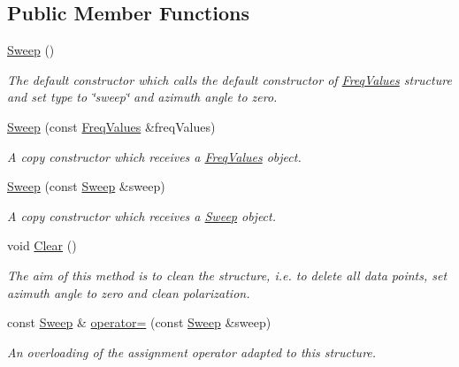 \subsection*{Public Member Functions}
\begin{DoxyCompactItemize}
\item 
\mbox{\label{structSweep_a154d8154b44ffd83c26375ca8d688591}} 
\hyperlink{structSweep_a154d8154b44ffd83c26375ca8d688591}{Sweep} ()
\begin{DoxyCompactList}\small\item\em The default constructor which calls the default constructor of {\itshape \hyperlink{structFreqValues}{Freq\+Values}} structure and set type to \char`\"{}sweep\char`\"{} and azimuth angle to zero. \end{DoxyCompactList}\item 
\hyperlink{structSweep_ae85ac9f2a48f93e3fc510118c7d67f7f}{Sweep} (const \hyperlink{structFreqValues}{Freq\+Values} \&freq\+Values)
\begin{DoxyCompactList}\small\item\em A copy constructor which receives a {\itshape \hyperlink{structFreqValues}{Freq\+Values}} object. \end{DoxyCompactList}\item 
\hyperlink{structSweep_a0a4e0f72fe9051d35cb29953005463b3}{Sweep} (const \hyperlink{structSweep}{Sweep} \&sweep)
\begin{DoxyCompactList}\small\item\em A copy constructor which receives a {\itshape \hyperlink{structSweep}{Sweep}} object. \end{DoxyCompactList}\item 
\mbox{\label{structSweep_aa852ab0cf53dc52ec354649cf6cec31e}} 
void \hyperlink{structSweep_aa852ab0cf53dc52ec354649cf6cec31e}{Clear} ()
\begin{DoxyCompactList}\small\item\em The aim of this method is to clean the structure, i.\+e. to delete all data points, set azimuth angle to zero and clean polarization. \end{DoxyCompactList}\item 
const \hyperlink{structSweep}{Sweep} \& \hyperlink{structSweep_a0cd5bc95e0e71b06887de9de4ea5ee6a}{operator=} (const \hyperlink{structSweep}{Sweep} \&sweep)
\begin{DoxyCompactList}\small\item\em An overloading of the assignment operator adapted to this structure. \end{DoxyCompactList}\end{DoxyCompactItemize}
